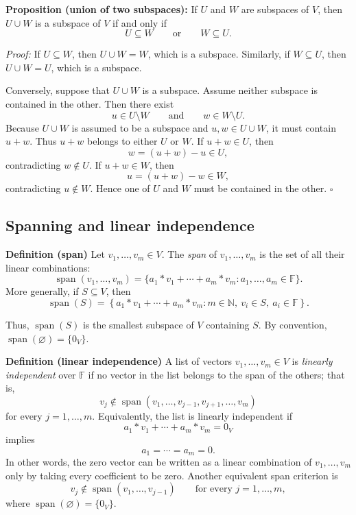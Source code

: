 \documentclass[a4paper,11pt,abstract=true]{scrartcl}
\theoremstyle{dotlessP}
\theoremstyle{dotlessS}
\theoremstyle{remark}
\theoremstyle{definition}
\begin{document}
\textbf{Proposition (union of two subspaces):} If $U$ and $W$ are subspaces
of $V$, then $U\cup W$ is a subspace of $V$ if and only if
\[
U\subseteq W
\qquad\text{or}\qquad
W\subseteq U.
\]

\textit{Proof:} If $U\subseteq W$, then $U\cup W=W$, which is a subspace.
Similarly, if $W\subseteq U$, then $U\cup W=U$, which is a subspace.

Conversely, suppose that $U\cup W$ is a subspace. Assume neither subspace is
contained in the other. Then there exist
\[
u\in U\setminus W
\qquad\text{and}\qquad
w\in W\setminus U.
\]
Because $U\cup W$ is assumed to be a subspace and $u,w\in U\cup W$, it must
contain $u+w$. Thus $u+w$ belongs to either $U$ or $W$. If $u+w\in U$, then
\[
w=(u+w)-u\in U,
\]
contradicting $w\notin U$. If $u+w\in W$, then
\[
u=(u+w)-w\in W,
\]
contradicting $u\notin W$. Hence one of $U$ and $W$ must be contained in the
other. \hfill$\square$

\subsection{Spanning and linear independence}
\begin{definition_box}
\textbf{Definition (span)} Let $v_1,\ldots,v_m\in V$. The \emph{span} of
$v_1,\ldots,v_m$ is the set of all their linear combinations:
\[
\operatorname{span}(v_1,\ldots,v_m)
=\{a_1*v_1+\cdots+a_m*v_m:a_1,\ldots,a_m\in \mathbb{F}\}.
\]
More generally, if $S\subseteq V$, then
\[
\operatorname{span}(S)
=\left\{a_1*v_1+\cdots+a_m*v_m:
m\in\mathbb{N},\ v_i\in S,\ a_i\in \mathbb{F}\right\}.
\]
\end{definition_box}

Thus, $\operatorname{span}(S)$ is the smallest subspace of $V$ containing
$S$. By convention, $\operatorname{span}(\varnothing)=\{0_V\}$.

\begin{definition_box}
\textbf{Definition (linear independence)} A list of vectors
$v_1,\ldots,v_m\in V$ is \emph{linearly independent} over $\mathbb{F}$ if no vector
in the list belongs to the span of the others; that is,
\[
v_j\notin\operatorname{span}(v_1,\ldots,v_{j-1},v_{j+1},\ldots,v_m)
\]
for every $j=1,\ldots,m$. Equivalently, the list is linearly independent if
\[
a_1*v_1+\cdots+a_m*v_m=0_V
\]
implies
\[
a_1=\cdots=a_m=0.
\]
In other words, the zero vector can be written as a linear combination of
$v_1,\ldots,v_m$ only by taking every coefficient to be zero. Another
equivalent span criterion is
\[
v_j\notin\operatorname{span}(v_1,\ldots,v_{j-1})
\qquad\text{for every }j=1,\ldots,m,
\]
where $\operatorname{span}(\varnothing)=\{0_V\}$.
\end{definition_box}
\end{document}
